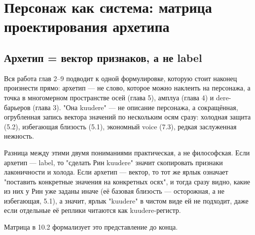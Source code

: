 \setcounter{chapter}{9}
\chapter{Персонаж как система: матрица проектирования архетипа}

\section{Архетип = вектор признаков, а не label}

Вся работа глав 2--9 подводит к одной формулировке, которую стоит наконец произнести прямо: архетип — не слово, которое можно наклеить на персонажа, а точка в многомерном пространстве осей (глава 5), амплуа (глава 4) и dere-барьеров (глава 3). "Она kuudere" — не описание персонажа, а сокращённая, огрубленная запись вектора значений по нескольким осям сразу: холодная защита (5.2), избегающая близость (5.1), экономный voice (7.3), редкая заслуженная нежность.

Разница между этими двумя пониманиями практическая, а не философская. Если архетип — label, то "сделать Рин kuudere" значит скопировать признаки лаконичности и холода. Если архетип — вектор, то тот же ярлык означает "поставить конкретные значения на конкретных осях", и тогда сразу видно, какие из них у Рин уже заданы иначе (её базовая близость — осторожная, а не избегающая, 5.1), а значит, ярлык "kuudere" в чистом виде ей не подходит, даже если отдельные её реплики читаются как kuudere-регистр.

Матрица в 10.2 формализует это представление до конца.
